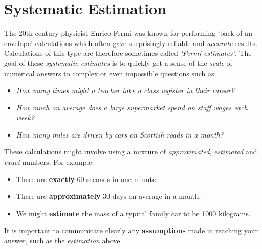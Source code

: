 \documentclass[
  11pt,
  openany]{book}
\begin{document}
\pagebreak

\section{Systematic Estimation}\label{systematic-estimation}

The 20th century physicist Enrico Fermi was known for performing `back of an envelope' calculations which often gave surprisingly reliable and \emph{accurate} results. Calculations of this type are therefore sometimes called \textit{`Fermi estimates'}. The goal of these \emph{systematic estimates} is to quickly get a sense of the \emph{scale} of numerical answers to complex or even impossible questions such as:

\begin{center}
    \begin{tcolorbox}[title=Questions,center,colback=Aquamarine!5,colframe=Aquamarine,width=16cm]
        \begin{itemize}
            \item \textit{How many times might a teacher take a class register in their career?}
            \item \textit{How much on average does a large supermarket spend on staff wages each week?}
            \item \textit{How many miles are driven by cars on Scottish roads in a month?}
        \end{itemize}
    \end{tcolorbox}
\end{center}

These calculations might involve using a mixture of \emph{approximated}, \emph{estimated} and \emph{exact} numbers. For example:

\begin{itemize}[leftmargin=2.3cm]
    \item There are \textbf{exactly} 60 seconds in one minute.
    \item There are \textbf{approximately} 30 days on average in a month.
    \item We might \textbf{estimate} the mass of a typical family car to be 1000 kilograms.
\end{itemize}

It is important to communicate clearly any \textbf{assumptions} made in reaching your answer, such as the \emph{estimation} above.
\end{document}
